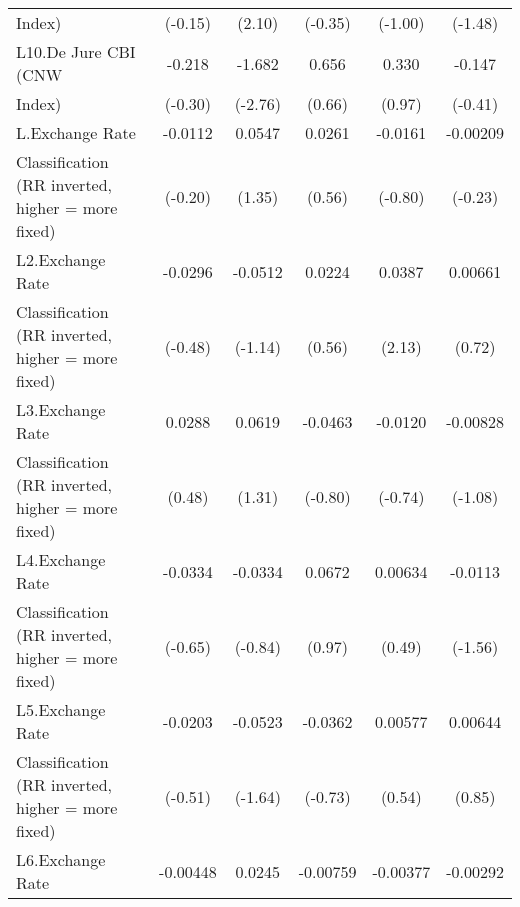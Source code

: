 {\begin{tabular}{l*{5}{c}}
Index)              &     (-0.15)         &      (2.10)         &     (-0.35)         &     (-1.00)         &     (-1.48)         \\
[1em]
L10.De Jure CBI (CNW&      -0.218         &      -1.682\sym{**} &       0.656         &       0.330         &      -0.147         \\
Index)              &     (-0.30)         &     (-2.76)         &      (0.66)         &      (0.97)         &     (-0.41)         \\
[1em]
L.Exchange Rate     &     -0.0112         &      0.0547         &      0.0261         &     -0.0161         &    -0.00209         \\
Classification (RR inverted, higher = more fixed)&     (-0.20)         &      (1.35)         &      (0.56)         &     (-0.80)         &     (-0.23)         \\
[1em]
L2.Exchange Rate    &     -0.0296         &     -0.0512         &      0.0224         &      0.0387\sym{*}  &     0.00661         \\
Classification (RR inverted, higher = more fixed)&     (-0.48)         &     (-1.14)         &      (0.56)         &      (2.13)         &      (0.72)         \\
[1em]
L3.Exchange Rate    &      0.0288         &      0.0619         &     -0.0463         &     -0.0120         &    -0.00828         \\
Classification (RR inverted, higher = more fixed)&      (0.48)         &      (1.31)         &     (-0.80)         &     (-0.74)         &     (-1.08)         \\
[1em]
L4.Exchange Rate    &     -0.0334         &     -0.0334         &      0.0672         &     0.00634         &     -0.0113         \\
Classification (RR inverted, higher = more fixed)&     (-0.65)         &     (-0.84)         &      (0.97)         &      (0.49)         &     (-1.56)         \\
[1em]
L5.Exchange Rate    &     -0.0203         &     -0.0523         &     -0.0362         &     0.00577         &     0.00644         \\
Classification (RR inverted, higher = more fixed)&     (-0.51)         &     (-1.64)         &     (-0.73)         &      (0.54)         &      (0.85)         \\
[1em]
L6.Exchange Rate    &    -0.00448         &      0.0245         &    -0.00759         &    -0.00377         &    -0.00292         \\

\end{tabular}}
